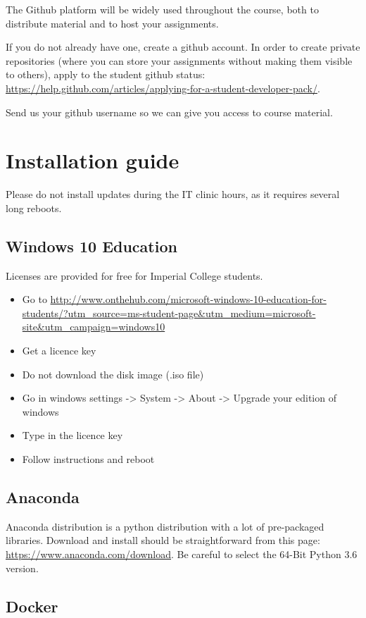 \documentclass[11pt]{article}
\begin{document}
The Github platform will be widely used throughout the course, both to distribute material and to host your assignments.

If you do not already have one, create a github account. 
In order to create private repositories (where you can store your assignments without making them visible to others), apply to the student github status: 
\url{https://help.github.com/articles/applying-for-a-student-developer-pack/}.

Send us your github username so we can give you access to course material.


\section{Installation guide}

Please do not install updates during the IT clinic hours, as it requires several long reboots.

\subsection{Windows 10 Education}

Licenses are provided for free for Imperial College students.
\begin{itemize}
  \item Go to \url{http://www.onthehub.com/microsoft-windows-10-education-for-students/?utm_source=ms-student-page&utm_medium=microsoft-site&utm_campaign=windows10}
  \item Get a licence key
  \item Do not download the disk image (.iso file)
  \item Go in windows settings -> System -> About -> Upgrade your edition of windows
  \item Type in the licence key
  \item Follow instructions and reboot
\end{itemize}

\subsection{Anaconda}

Anaconda distribution is a python distribution with a lot of pre-packaged libraries. 
Download and install should be straightforward from this page: \url{https://www.anaconda.com/download}. 
Be careful to select the 64-Bit Python 3.6 version.

\subsection{Docker}
\end{document}
